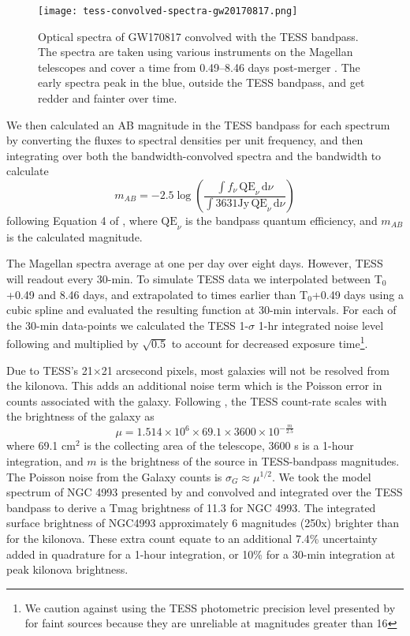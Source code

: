 \documentclass[modern]{aastex61}
\begin{document}
\begin{figure}
\centering
\texttt{[image: tess-convolved-spectra-gw20170817.png]}
\caption{Optical spectra of GW170817 convolved with the TESS bandpass. The spectra are taken using various instruments on the Magellan telescopes and cover a time from 0.49--8.46 days post-merger \citep{Shappee2017}. The early spectra peak in the blue, outside the TESS bandpass, and get redder and fainter over time.}
\label{fig:spectra}
\end{figure}
We then calculated an AB magnitude \citep{Oke1983} in the TESS bandpass for each spectrum by converting the fluxes to spectral densities per unit frequency, and then integrating over both the bandwidth-convolved spectra and the bandwidth to calculate
\begin{equation}
m_{AB} = -2.5\log{ \left(\frac{\int{f_\nu\, \mathrm{QE}_\nu\, \mathrm{d}\nu}}{\int{3631 \mathrm{Jy}\,  \mathrm{QE}_\nu\, \mathrm{d}\nu}} \right )}
\end{equation}
following Equation 4 of \citet{Tonry2012}, where $\mathrm{QE}_\nu$ is the bandpass quantum efficiency, and $m_{AB}$ is the calculated magnitude. 

The Magellan spectra average at one per day over eight days. However, TESS will readout every 30-min. To simulate TESS data we interpolated between T$_0$+0.49 and 8.46 days, and extrapolated to times earlier than T$_0$+0.49 days using a cubic spline and evaluated the resulting function at 30-min intervals. For each of the 30-min data-points we calculated the TESS 1-$\sigma$ 1-hr integrated noise level following \citet{Ricker2015} and multiplied by $\sqrt{0.5}$ to account for decreased exposure time\footnote{We caution against using the TESS photometric precision level presented by \citet{Stassun2017} for faint sources because they are unreliable at magnitudes greater than 16}. 

Due to TESS's 21$\times$21 arcsecond pixels, most galaxies will not be resolved from the kilonova. This adds an additional noise term which is the Poisson error in counts associated with the galaxy. Following \citet{Bouma2017}, the TESS count-rate scales with the brightness of the galaxy as
\begin{equation}
\mu = 1.514\times10^6 \times 69.1 \times 3600 \times 10^{- \frac{m}{2.5}}
\end{equation}
where 69.1 cm$^2$ is the collecting area of the telescope, 3600 s is a 1-hour integration, and $m$ is the brightness of the source in TESS-bandpass magnitudes. The Poisson noise from the Galaxy counts is $\sigma_G\approx\mu^{1/2}$. We took the model spectrum of NGC 4993 presented by \citet{Troja2017} and convolved and integrated over the TESS bandpass to derive a Tmag brightness of 11.3 for NGC 4993. The integrated surface brightness of NGC4993 approximately 6 magnitudes (250x) brighter than for the kilonova. These extra count equate to an additional 7.4\% uncertainty added in quadrature for a 1-hour integration, or 10\% for a 30-min integration at peak kilonova brightness. 
\end{document}
